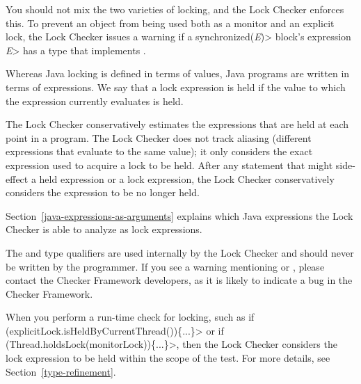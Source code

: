 You should not mix the two varieties of locking, and the Lock Checker
enforces this.  To prevent an object from being used both as a monitor and
an explicit lock, the Lock Checker issues a warning if a
\<synchronized(\emph{E})> block's expression \<\emph{E}> has a type that
implements .



Whereas Java locking is defined in terms of values, Java programs are
written in terms of expressions.
We say that a lock expression is held if the value to which the expression
currently evaluates is held.

The Lock Checker conservatively estimates the expressions that are held at
each point in a program.
The Lock Checker does not track aliasing
(different expressions that evaluate to the same value); it only considers
the exact expression used to acquire a lock to be held.  After any statement
that might side-effect a held expression or a lock expression, the Lock
Checker conservatively considers the expression to be no longer held.

Section~\ref{java-expressions-as-arguments} explains which Java
expressions the Lock Checker is able to analyze as lock expressions.


The  and  type qualifiers are used internally by the Lock Checker
and should never be written by the programmer.
If you
see a warning mentioning  or ,
please contact the Checker Framework developers, as it is likely to
indicate a bug in the Checker Framework.



When you perform a run-time check for locking, such as
\<if (explicitLock.isHeldByCurrentThread())\{...\}> or
\<if (Thread.holdsLock(monitorLock))\{...\}>,
then the Lock Checker considers the lock expression to be held
within the scope of the test.  For more details, see
Section~\ref{type-refinement}.



